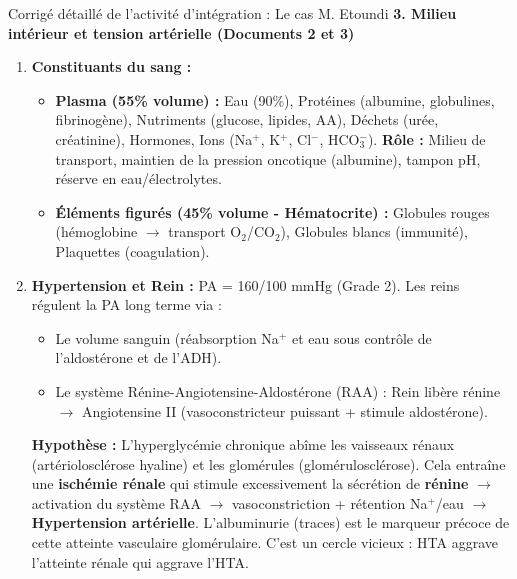 \documentclass[11pt]{article}
\begin{document}
\begin{exoresolu}{Corrigé détaillé de l'activité d'intégration : Le cas M. Etoundi}
\textbf{3. Milieu intérieur et tension artérielle (Documents 2 et 3)}
\begin{enumerate}
    \item \textbf{Constituants du sang :}
    \begin{itemize}
        \item \textbf{Plasma (55\% volume) :} Eau (\num{90}\%), Protéines (albumine, globulines, fibrinogène), Nutriments (glucose, lipides, AA), Déchets (urée, créatinine), Hormones, Ions (Na$^+$, K$^+$, Cl$^-$, HCO$_3^-$). \textbf{Rôle :} Milieu de transport, maintien de la pression oncotique (albumine), tampon pH, réserve en eau/électrolytes.
        \item \textbf{Éléments figurés (45\% volume - Hématocrite) :} Globules rouges (hémoglobine $\to$ transport O$_2$/CO$_2$), Globules blancs (immunité), Plaquettes (coagulation).
    \end{itemize}
    \item \textbf{Hypertension et Rein :} PA = 160/100 mmHg (Grade 2). Les reins régulent la PA long terme via :
    \begin{itemize}
        \item Le volume sanguin (réabsorption Na$^+$ et eau sous contrôle de l'aldostérone et de l'ADH).
        \item Le système Rénine-Angiotensine-Aldostérone (RAA) : Rein libère rénine $\to$ Angiotensine II (vasoconstricteur puissant + stimule aldostérone).
    \end{itemize}
    \textbf{Hypothèse :} L'hyperglycémie chronique abîme les vaisseaux rénaux (artériolosclérose hyaline) et les glomérules (glomérulosclérose). Cela entraîne une \textbf{ischémie rénale} qui stimule excessivement la sécrétion de \textbf{rénine} $\to$ activation du système RAA $\to$ vasoconstriction + rétention Na$^+$/eau $\to$ \textbf{Hypertension artérielle}. L'albuminurie (traces) est le marqueur précoce de cette atteinte vasculaire glomérulaire. C'est un cercle vicieux : HTA aggrave l'atteinte rénale qui aggrave l'HTA.
\end{enumerate}


\end{exoresolu}
\end{document}
